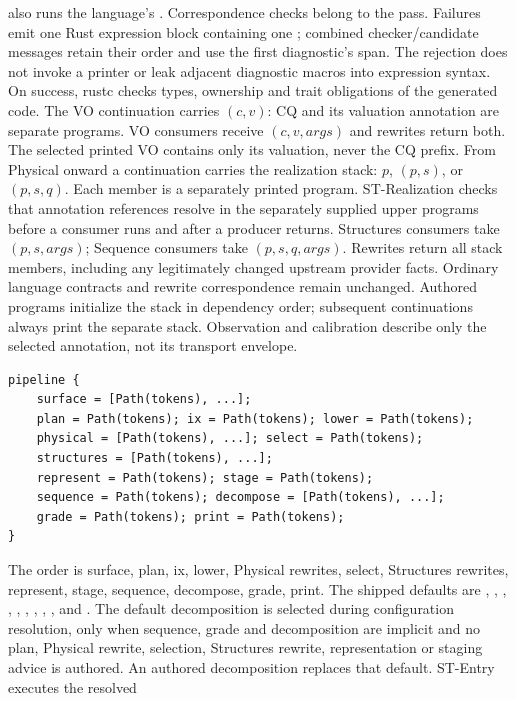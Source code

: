 also runs the language's . Correspondence checks belong to the
pass. Failures emit one Rust expression block containing one
; combined checker/candidate messages retain their order
and use the first diagnostic's span. The rejection does not invoke a printer
or leak adjacent diagnostic macros into expression syntax. On success, rustc
checks types, ownership and trait obligations of the generated code.
The VO continuation carries $(c,v)$: CQ and its valuation annotation are
separate programs. VO consumers receive $(c,v,args)$ and rewrites return both.
The selected printed VO contains only its valuation, never the CQ prefix.
From Physical onward a continuation carries the realization stack:
$p$, $(p,s)$, or $(p,s,q)$. Each member is a separately printed program.
ST-Realization checks that annotation references resolve in the separately
supplied upper programs before a consumer runs and after a producer returns.
Structures consumers take $(p,s,args)$; Sequence consumers take $(p,s,q,args)$.
Rewrites return all stack members, including any legitimately changed upstream
provider facts. Ordinary language contracts and rewrite correspondence remain
unchanged. Authored programs initialize the stack in dependency order; subsequent
continuations always print the separate stack. Observation and calibration
describe only the selected annotation, not its transport envelope.
\begin{lstlisting}
pipeline {
    surface = [Path(tokens), ...];
    plan = Path(tokens); ix = Path(tokens); lower = Path(tokens);
    physical = [Path(tokens), ...]; select = Path(tokens);
    structures = [Path(tokens), ...];
    represent = Path(tokens); stage = Path(tokens);
    sequence = Path(tokens); decompose = [Path(tokens), ...];
    grade = Path(tokens); print = Path(tokens);
}
\end{lstlisting}
The order is surface, plan, ix, lower, Physical rewrites, select, Structures
rewrites, represent, stage, sequence, decompose, grade, print. The shipped defaults
are , , , ,
, , , ,
, and . The default decomposition
 is selected during configuration resolution, only when
sequence, grade and decomposition are implicit and no plan, Physical rewrite,
selection, Structures rewrite, representation or staging advice is authored.
An authored decomposition replaces that default. ST-Entry executes the resolved
